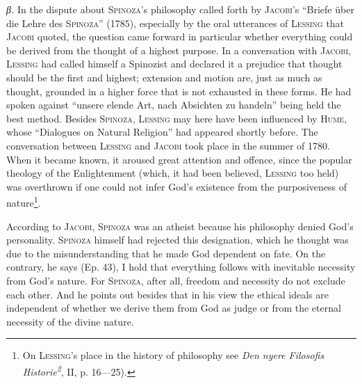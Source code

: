\documentclass[12pt]{article}
\newcommand{\opage}[1]{\marginnote{\footnotesize\textit{[#1]}}}
\begin{document}
\textit{β.} In the dispute about \textsc{Spinoza}'s philosophy called forth by
\textsc{Jacobi}'s ``Briefe über die Lehre des \textsc{Spinoza}'' (1785), especially by
the oral utterances of \textsc{Lessing} that \textsc{Jacobi} quoted, the question came
forward in particular whether everything could be derived from the thought of a highest
purpose. In a conversation with \textsc{Jacobi}, \textsc{Lessing} had called himself a
Spinozist and declared it a prejudice that thought should be the first and highest;
extension and motion are, just as much as thought, grounded in a higher force that is not
exhausted in these forms. He had spoken against ``unsere elende Art, nach Absichten zu
handeln'' being held the best method. Besides \textsc{Spinoza}, \textsc{Lessing} may here
have been influenced by \textsc{Hume}, whose ``Dialogues on Natural Religion'' had
appeared shortly before. The conversation between \textsc{Lessing} and \textsc{Jacobi}
took place in the summer of 1780. When it became known, it aroused great attention and
offence, since the popular theology of the Enlightenment (which, it had been believed,
\textsc{Lessing} too held) was overthrown if one could not infer God's existence from the
purposiveness of nature\footnote{On \textsc{Lessing}'s place in the history of philosophy
see \textit{Den nyere Filosofis Historie\textsuperscript{2}}, II, p. 16---25).}.

\opage{34}According to \textsc{Jacobi}, \textsc{Spinoza} was an atheist because his
philosophy denied God's personality. \textsc{Spinoza} himself had rejected this
designation, which he thought was due to the misunderstanding that he made God dependent
on fate. On the contrary, he says (Ep. 43), I hold that everything follows with inevitable
necessity from God's nature. For \textsc{Spinoza}, after all, freedom and necessity do not
exclude each other. And he points out besides that in his view the ethical ideals are
independent of whether we derive them from God as judge or from the eternal necessity of
the divine nature.
\end{document}
